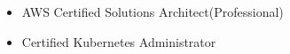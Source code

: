 \documentclass{resume}
\begin{document}



\begin{body}
	\begin{itemize}[noitemsep,topsep=0pt]
		\item AWS Certified Solutions Architect(Professional)
		\item Certified Kubernetes Administrator
	\end{itemize}
\end{body}


\end{document}
